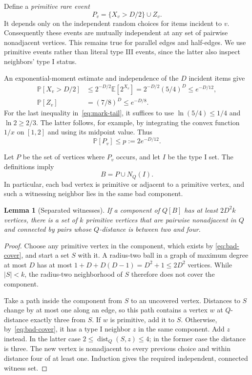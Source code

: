 \documentclass[11pt]{article}
\newtheorem{lemma}[theorem]{Lemma}
\theoremstyle{definition}
\newcommand{\dist}{\operatorname{dist}}
\newcommand{\Prb}{\mathbb P}
\newcommand{\EE}{\mathbb E}
\begin{document}
Define a \emph{primitive rare event}
\[
 P_v=\{X_v>D/2\}\cup Z_v.
\]
It depends only on the independent random choices for items incident to
$v$. Consequently these events are mutually independent at any set of
pairwise nonadjacent vertices. This remains true for parallel edges and
half-edges. We use primitive events rather than literal type III events,
since the latter also inspect neighbors' type I status.

An exponential-moment estimate and independence of the $D$ incident items
give
\begin{align}
 \Prb[X_v>D/2]
 &\le 2^{-D/2}\EE[2^{X_v}]
  =2^{-D/2}(5/4)^D\le e^{-D/12},\label{eq:mark-tail}\\
 \Prb[Z_v]&=(7/8)^D\le e^{-D/8}.\label{eq:zero-tail}
\end{align}
For the last inequality in~\eqref{eq:mark-tail}, it suffices to use
$\ln(5/4)\le1/4$ and $\ln2\ge2/3$. The latter follows, for example,
by integrating the convex function $1/x$ on $[1,2]$ and using its midpoint
value. Thus
\begin{equation}\label{eq:rare-prob}
 \Prb[P_v]\le p:=2e^{-D/12}.
\end{equation}

Let $P$ be the set of vertices where $P_v$ occurs, and let $I$ be the type I
set. The definitions imply
\begin{equation}\label{eq:bad-cover}
 B=P\cup N_Q(I).
\end{equation}
In particular, each bad vertex is primitive or adjacent to a primitive
vertex, and such a witnessing neighbor lies in the same bad component.

\begin{lemma}[Separated witnesses]\label{lem:witness}
If a component of $Q[B]$ has at least $2D^2k$ vertices, there is a set of
$k$ primitive vertices that are pairwise nonadjacent in $Q$ and connected
by pairs whose $Q$-distance is between two and four.
\end{lemma}
\begin{proof}
Choose any primitive vertex in the component, which exists by
\eqref{eq:bad-cover}, and start a set $S$ with it. A radius-two ball in a
graph of maximum degree at most $D$ has at most
$1+D+D(D-1)=D^2+1\le2D^2$ vertices. While $|S|<k$, the radius-two
neighborhood of $S$ therefore does not cover the component.

Take a path inside the component from $S$ to an uncovered vertex. Distances
to $S$ change by at most one along an edge, so this path contains a vertex
$w$ at $Q$-distance exactly three from $S$. If $w$ is primitive, add it to
$S$. Otherwise, by~\eqref{eq:bad-cover}, it has a type I neighbor $z$ in
the same component. Add $z$ instead. In the latter case
$2\le\dist_Q(S,z)\le4$; in the former case the distance is three.
The new vertex is nonadjacent to every previous choice and within distance
four of at least one. Induction gives the required independent, connected
witness set.
\end{proof}
\end{document}
